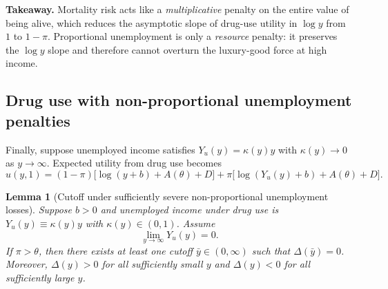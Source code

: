 \documentclass[parskip=full]{article}
\theoremstyle{plain}      %
\newtheorem{lemma}{Lemma}
\theoremstyle{remark}    %
\begin{document}
\medskip
\noindent\textbf{Takeaway.}
Mortality risk acts like a \emph{multiplicative} penalty on the entire value of being alive, which reduces the
asymptotic slope of drug-use utility in $\log y$ from $1$ to $1-\pi$. Proportional unemployment is only a
\emph{resource} penalty: it preserves the $\log y$ slope and therefore cannot overturn the luxury-good force at high income.

\subsection{Drug use with non-proportional unemployment penalties}

Finally, suppose unemployed income satisfies $Y_u(y)=\kappa(y)y$ with $\kappa(y)\to 0$ as $y\to\infty$. Expected utility from drug use becomes
\[u(y,1)=(1-\pi)\big[\log(y+b)+A(\theta)+D\big]
+\pi\big[\log(Y_u(y)+b)+A(\theta)+D\big].\]

\begin{lemma}[Cutoff under sufficiently severe non-proportional unemployment losses]\label{lem:nonprop_cutoff}
Suppose $b>0$ and unemployed income under drug use is $Y_u(y)\equiv \kappa(y)y$ with $\kappa(y)\in(0,1)$.
Assume
\[\lim_{y\to\infty} Y_u(y)=0.\]
If $\pi>\theta$, then there exists at least one cutoff $\bar y\in(0,\infty)$ such that $\Delta(\bar y)=0$.
Moreover, $\Delta(y)>0$ for all sufficiently small $y$ and $\Delta(y)<0$ for all sufficiently large $y$.
\end{lemma}
\end{document}
